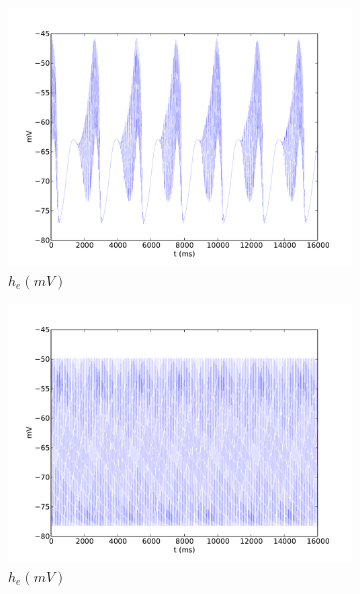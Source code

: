 \documentclass[a4paper,12pt]{article}
\begin{document}
\begin{figure}
	\begin{subfigure}[b]{0.3\textwidth}
		\includegraphics[scale=0.22]{chosen-frontiers-2012/00416-he-phi.pdf}
		\caption{$h_e (mV)$}
	\end{subfigure}
	\begin{subfigure}[b]{0.3\textwidth}
		\includegraphics[scale=0.22]{chosen-frontiers-2012/00416-0_5-2-1-he-phi.pdf}
		\caption{$h_e (mV)$}
	\end{subfigure}
	\begin{subfigure}[b]{0.3\textwidth}

\end{subfigure}
\end{figure}
\end{document}
